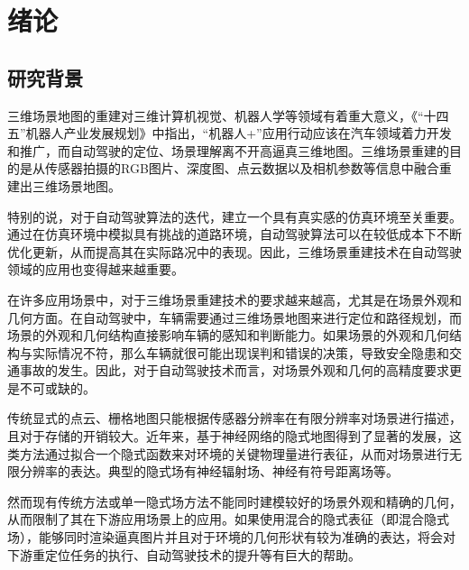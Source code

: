 %
%
%
%
%
%

\chapter{绪论}

\section{研究背景}
三维场景地图的重建对三维计算机视觉、机器人学等领域有着重大意义，《“十四五”机器人产业发展规划》中指出，“机器人+”应用行动应该在汽车领域着力开发和推广，而自动驾驶的定位、场景理解离不开高逼真三维地图。三维场景重建的目的是从传感器拍摄的RGB图片、深度图、点云数据以及相机参数等信息中融合重建出三维场景地图。

特别的说，对于自动驾驶算法的迭代，建立一个具有真实感的仿真环境至关重要。通过在仿真环境中模拟具有挑战的道路环境，自动驾驶算法可以在较低成本下不断优化更新，从而提高其在实际路况中的表现。因此，三维场景重建技术在自动驾驶领域的应用也变得越来越重要。

在许多应用场景中，对于三维场景重建技术的要求越来越高，尤其是在场景外观和几何方面。在自动驾驶中，车辆需要通过三维场景地图来进行定位和路径规划，而场景的外观和几何结构直接影响车辆的感知和判断能力。如果场景的外观和几何结构与实际情况不符，那么车辆就很可能出现误判和错误的决策，导致安全隐患和交通事故的发生。因此，对于自动驾驶技术而言，对场景外观和几何的高精度要求更是不可或缺的。

传统显式的点云、栅格地图只能根据传感器分辨率在有限分辨率对场景进行描述，且对于存储的开销较大。近年来，基于神经网络的隐式地图得到了显著的发展，这类方法通过拟合一个隐式函数来对环境的关键物理量进行表征，从而对场景进行无限分辨率的表达。典型的隐式场有神经辐射场、神经有符号距离场等。

然而现有传统方法或单一隐式场方法不能同时建模较好的场景外观和精确的几何，从而限制了其在下游应用场景上的应用。如果使用混合的隐式表征（即混合隐式场），能够同时渲染逼真图片并且对于环境的几何形状有较为准确的表达，将会对下游重定位任务的执行、自动驾驶技术的提升等有巨大的帮助。

